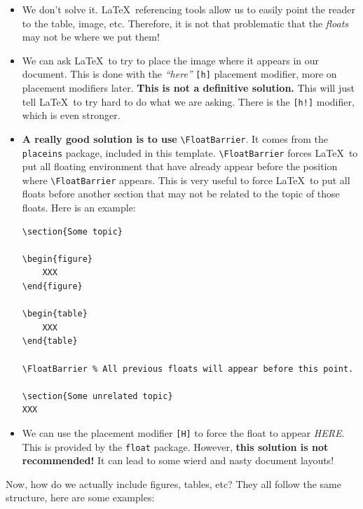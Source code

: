 \begin{itemize}
	\item We don't solve it. \LaTeX\ referencing tools allow us to easily point the reader to the table, image, etc. Therefore, it is not that problematic that the \emph{floats} may not be where we put them!
	\item We can ask \LaTeX\ to try to place the image where it appears in our document. This is done with the \emph{``here''} \verb|[h]| placement modifier, more on placement modifiers later. \textbf{This is not a definitive solution.} This will just tell \LaTeX\ to try hard to do what we are asking. There is the \verb|[h!]| modifier, which is even stronger.
	\item \textbf{A really good solution is to use} \verb|\FloatBarrier|. It comes from the \verb|placeins| package, included in this template. \verb|\FloatBarrier| forces \LaTeX\ to put all floating environment that have already appear before the position where \verb|\FloatBarrier| appears. This is very useful to force \LaTeX\ to put all floats before another section that may not be related to the topic of those floats. Here is an example:

\begin{lstlisting}[language={[LaTeX]TeX}]
\section{Some topic}

\begin{figure}
	XXX
\end{figure}

\begin{table}
	XXX
\end{table}

\FloatBarrier % All previous floats will appear before this point.

\section{Some unrelated topic}
XXX
\end{lstlisting}
	\item We can use the placement modifier \verb|[H]| to force the float to appear \emph{HERE}. This is provided by the \verb|float| package. However, \textbf{this solution is not recommended!} It can lead to some wierd and nasty document layouts!
\end{itemize}

Now, how do we actually include figures, tables, etc? They all follow the same structure, here are some examples:

